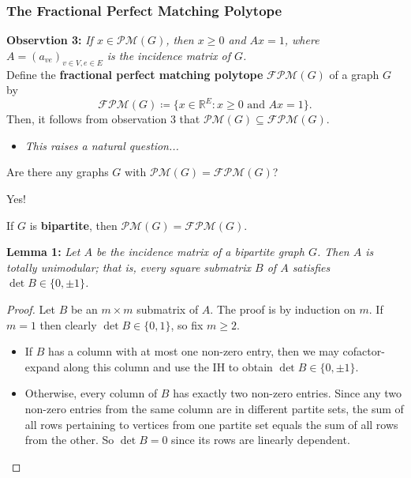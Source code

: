 \begin{frame}
\frametitle{The Fractional Perfect Matching Polytope}
\textbf{Observtion 3:} \emph{If \( x \in \mathcal{P} \mathcal{M} (G) \), then \( x \geq 0 \) and \( Ax = 1 \), where \( A = (a_{ve})_{v \in V, e \in E}  \) is the incidence matrix of \( G \).}\\
\vspace{0.3cm}
Define the \textbf{fractional perfect matching polytope} \( \mathcal{F} \mathcal{P}\mathcal{M} (G)  \) of a graph \( G \) by \[ \mathcal{FPM}(G) \coloneqq \{ x \in \mathbb{R}^{E} : x \geq 0 \mbox{ and } Ax = 1 \}.   \] Then, it follows from observation 3 that \( \mathcal{PM} (G) \subseteq \mathcal{FPM} (G) \).
\begin{itemize}
	\item<2> \emph{This raises a natural question...} 
	
\end{itemize}
\end{frame}

\begin{frame}
\begin{center}
\Large Are there any graphs \( G \) with \( \mathcal{PM} (G) = \mathcal{FPM} (G) \)?
\end{center}
\end{frame}

\begin{frame}
\begin{center}
	\Large Yes!
\end{center}
\end{frame}

\begin{frame}
\begin{center}
	\Large If \( G \) is \textbf{\alert{bipartite}}, then \( \mathcal{PM} (G) = \mathcal{FPM} (G) \).
\end{center}
\end{frame}

\begin{frame}
\textbf{Lemma 1:} \emph{Let \( A \) be the incidence matrix of a bipartite graph \( G \). Then \( A \) is totally unimodular; that is, every square submatrix \( B \) of \( A \) satisfies \( \det B \in \{ 0, \pm 1 \}  \).}
\begin{proof}
Let \( B \) be an \( m \times m \) submatrix of \( A \). The proof is by induction on \( m \). If \( m = 1 \) then clearly \( \det B \in \{ 0,1 \}  \), so fix \( m \geq 2 \).
\begin{itemize}
	\item If \( B \) has a column with at most one non-zero entry, then we may cofactor-expand along this column and use the IH to obtain \( \det B \in \{ 0, \pm 1 \}  \).
	\item Otherwise, every column of \( B \) has exactly two non-zero entries. Since any two non-zero entries from the same column are in different partite sets, the sum of all rows pertaining to vertices from one partite set equals the sum of all rows from the other. So \( \det B = 0 \) since its rows are linearly dependent.
	
\end{itemize}
\end{proof}
\end{frame}

